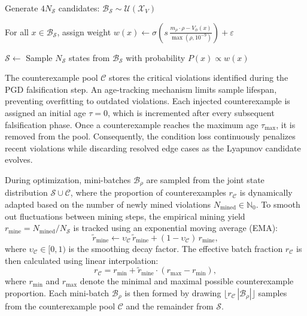\begin{algorithm}[htpb]
    \caption{Probabilistic Explorative State Pool Resampling}
    \label{alg:state-pool-resample}


    \BlankLine
    Generate $4 N_{\mathcal{S}}$ candidates: $\mathcal{B}_{\mathcal{S}} \sim \mathcal{U}(\mathcal{X}_V)$\;

    \BlankLine
    For all $x \in \mathcal{B}_{\mathcal{S}}$, assign weight $w(x) \leftarrow \sigma \left(
        s \, \frac{m_\rho \cdot \rho - V_\phi(x)}{\max(\rho, 10^{-9})}
    \right) + \varepsilon$\;

    \BlankLine
    $\mathcal{S} \leftarrow$ Sample $N_{\mathcal{S}}$ states from $\mathcal{B}_{\mathcal{S}}$ with probability $P(x) \propto w(x)$\;
\end{algorithm}

The counterexample pool $\mathcal{C}$ stores the critical violations identified during the PGD falsification step. 
An age-tracking mechanism limits sample lifespan, preventing overfitting to outdated violations.
Each injected counterexample is assigned an initial age $\tau = 0$, which is incremented after every subsequent falsification phase. 
Once a counterexample reaches the maximum age $\tau_{\max}$, it is removed from the pool. 
Consequently, the condition loss continuously penalizes recent violations while discarding resolved edge cases as the Lyapunov candidate evolves.

During optimization, mini-batches $\mathcal{B}_\rho$ are sampled from the joint state distribution $\mathcal{S} \cup \mathcal{C}$, 
where the proportion of counterexamples $r_{\mathcal{C}}$ is dynamically adapted based on the number of newly mined violations 
$N_{\mathrm{mined}} \in \mathbb{N}_0$. To smooth out fluctuations between mining steps, the empirical mining yield 
$r_{\mathrm{mine}} = N_{\mathrm{mined}} / N_{\mathcal{S}}$ is tracked using an exponential moving average (EMA):
\begin{equation}
    \label{eq:cex-fraction-ema}
    \tilde{r}_{\mathrm{mine}} \leftarrow \upsilon_{\mathcal{C}} \, \tilde{r}_{\mathrm{mine}} + (1 - \upsilon_{\mathcal{C}}) \, r_{\mathrm{mine}},
\end{equation}
where $\upsilon_{\mathcal{C}} \in [0, 1)$ is the smoothing decay factor. 
The effective batch fraction $r_{\mathcal{C}}$ is then calculated using linear interpolation:
\begin{equation}
    \label{eq:cex-fraction-interp}
    r_{\mathcal{C}} = r_{\min} + \tilde{r}_{\mathrm{mine}} \cdot (r_{\max} - r_{\min}),
\end{equation}
where $r_{\min}$ and $r_{\max}$ denote the minimal and maximal possible counterexample proportion. 
Each mini-batch $\mathcal{B}_\rho$ is then formed by drawing $\lfloor r_{\mathcal{C}} \, |\mathcal{B}_\rho| \rfloor$ 
samples from the counterexample pool $\mathcal{C}$ and the remainder from $\mathcal{S}$.



